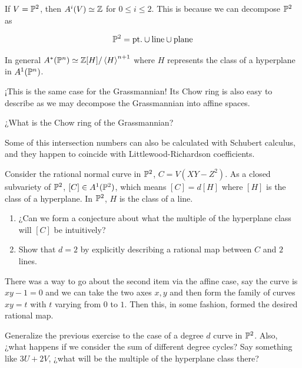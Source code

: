 \documentclass[12pt]{memoir}
\begin{document}
\begin{Ex}
    If \(V=\mathbb{P}^2\), then \(A^{i}(V)\simeq\mathbb{Z}\) for \(0\leq i\leq 2\). This is because we can decompose \(\mathbb{P}^2\) as

    \[\mathbb{P}^2=\text{pt.}\cup\text{line}\cup\text{plane}\]

    In general \(A^\ast(\mathbb{P}^n)\simeq\mathbb{Z}[H]/\left\langle H\right\rangle^{n+1}\) where \(H\) represents the class of a hyperplane in \(A^1(\mathbb{P}^n)\).\par
    ¡This is the same case for the Grassmannian! Its Chow ring is also easy to describe as we may decompose the Grassmannian into affine spaces.
\end{Ex}

\begin{Qn}
    ¿What is the Chow ring of the Grassmannian?
\end{Qn}

\begin{Rmk}
    Some of this intersection numbers can also be calculated with Schubert calculus, and they happen to coincide with Littlewood-Richardson coefficients.
\end{Rmk}

\begin{Ej}
    Consider the rational normal curve in \(\mathbb{P}^2\), \(C=V(XY-Z^2)\). As a closed subvariety of \(\mathbb{P}^2\), \([C]\in A^1(\mathbb{P}^2)\), which means \([C]=d[H]\) where \([H]\) is the class of a hyperplane. In \(\mathbb{P}^2\), \(H\) is the class of a line.
    \begin{enumerate}
        \item ¿Can we form a conjecture about what the multiple of the hyperplane class will \([C]\) be intuitively?
        \item Show that \(d=2\) by explicitly describing a rational map between \(C\) and \(2\) lines.
    \end{enumerate}
\end{Ej}

\begin{ptcb}
    There was a way to go about the second item via the affine case, say the curve is \(xy-1=0\) and we can take the two axes \(x,y\) and then form the family of curves \(xy=t\) with \(t\) varying from \(0\) to \(1\). Then this, in some fashion, formed the desired rational map. 
\end{ptcb}

\begin{Ej}
    Generalize the previous exercise to the case of a degree \(d\) curve in \(\mathbb{P}^2\). Also, ¿what happens if we consider the sum of different degree cycles? Say something like \(3U+2V\), ¿what will be the multiple of the hyperplane class there?
\end{Ej}
\end{document}
